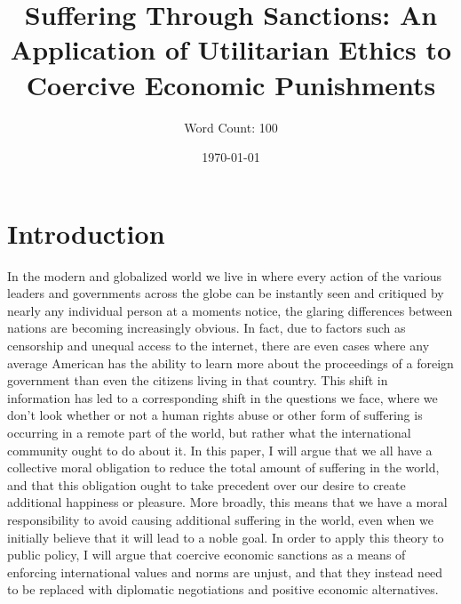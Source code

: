 \documentclass[12pt]{article}
\title{Suffering Through Sanctions: An Application of Utilitarian Ethics to Coercive Economic Punishments}
\author{Word Count: 100}
\date{\today}
\begin{document}
\maketitle
\newpage
{}

\section*{Introduction}
In the modern and globalized world we live in where every action of the various leaders and governments across the globe can be instantly seen and critiqued by nearly any individual person at a moments notice, the glaring differences between nations are becoming increasingly obvious.
In fact, due to factors such as censorship and unequal access to the internet, there are even cases where any average American has the ability to learn more about the proceedings of a foreign government than even the citizens living in that country.
This shift in information has led to a corresponding shift in the questions we face, where we don't look whether or not a human rights abuse or other form of suffering is occurring in a remote part of the world, but rather what the international community ought to do about it.
In this paper, I will argue that we all have a collective moral obligation to reduce the total amount of suffering in the world, and that this obligation ought to take precedent over our desire to create additional happiness or pleasure.
More broadly, this means that we have a moral responsibility to avoid causing additional suffering in the world, even when we initially believe that it will lead to a noble goal.
In order to apply this theory to public policy, I will argue that coercive economic sanctions as a means of enforcing international values and norms are unjust, and that they instead need to be replaced with diplomatic negotiations and positive economic alternatives.
\end{document}
